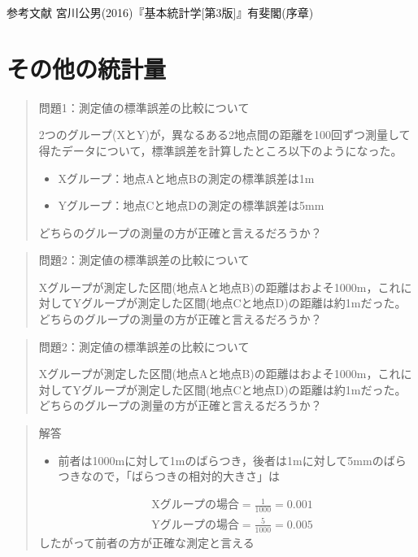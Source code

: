 \documentclass[
]{book}
\providecommand{\tightlist}{%
  \setlength{\itemsep}{0pt}\setlength{\parskip}{0pt}}
\theoremstyle{definition}
\theoremstyle{definition}
\theoremstyle{definition}
\theoremstyle{definition}
\theoremstyle{remark}
\begin{document}
参考文献 宮川公男(2016)『基本統計学{[}第3版{]}』有斐閣(序章)

\hypertarget{ux305dux306eux4ed6ux306eux7d71ux8a08ux91cf}{%
\chapter{その他の統計量}\label{ux305dux306eux4ed6ux306eux7d71ux8a08ux91cf}}

\begin{quote}
問題1：測定値の標準誤差の比較について

2つのグループ(XとY)が，異なるある2地点間の距離を100回ずつ測量して得たデータについて，標準誤差を計算したところ以下のようになった。

\begin{itemize}
\tightlist
\item
  Xグループ：地点Aと地点Bの測定の標準誤差は1m
\item
  Yグループ：地点Cと地点Dの測定の標準誤差は5mm
\end{itemize}

どちらのグループの測量の方が正確と言えるだろうか？
\end{quote}

\begin{quote}
問題2：測定値の標準誤差の比較について

Xグループが測定した区間(地点Aと地点B)の距離はおよそ1000m，これに対してYグループが測定した区間(地点Cと地点D)の距離は約1mだった。
どちらのグループの測量の方が正確と言えるだろうか？
\end{quote}

\begin{quote}
問題2：測定値の標準誤差の比較について

Xグループが測定した区間(地点Aと地点B)の距離はおよそ1000m，これに対してYグループが測定した区間(地点Cと地点D)の距離は約1mだった。
どちらのグループの測量の方が正確と言えるだろうか？
\end{quote}

\begin{quote}
解答

\begin{itemize}
\tightlist
\item
  前者は1000mに対して1mのばらつき，後者は1mに対して5mmのばらつきなので，「ばらつきの相対的大きさ」は
\end{itemize}

\begin{align*}
&\text{Xグループの場合}=\frac{1}{1000}=0.001 \\
&\text{Yグループの場合}=\frac{5}{1000}=0.005
\end{align*}
したがって前者の方が正確な測定と言える
\end{quote}
\end{document}
